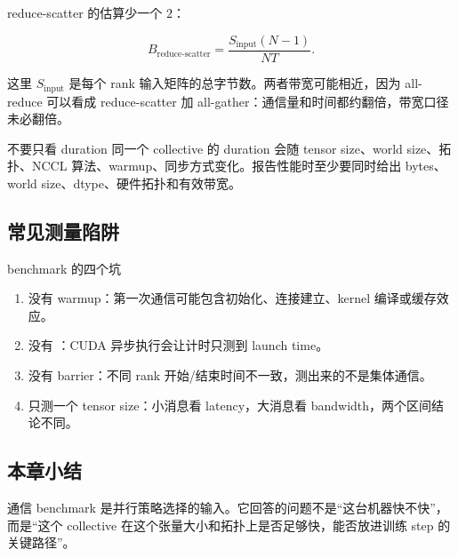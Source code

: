 reduce-scatter 的估算少一个 \(2\)：

\[
B_{\text{reduce-scatter}}
    =
\frac{S_{\text{input}}(N-1)}{N T}.
\]

这里 \(S_{\text{input}}\) 是每个 rank 输入矩阵的总字节数。两者带宽可能相近，因为 all-reduce 可以看成 reduce-scatter 加 all-gather：通信量和时间都约翻倍，带宽口径未必翻倍。

\begin{importantbox}{不要只看 duration}
同一个 collective 的 duration 会随 tensor size、world size、拓扑、NCCL 算法、warmup、同步方式变化。报告性能时至少要同时给出 bytes、world size、dtype、硬件拓扑和有效带宽。
\end{importantbox}

\subsection{常见测量陷阱}

\begin{warningbox}{benchmark 的四个坑}
\begin{enumerate}
    \item 没有 warmup：第一次通信可能包含初始化、连接建立、kernel 编译或缓存效应。
    \item 没有 ：CUDA 异步执行会让计时只测到 launch time。
    \item 没有 barrier：不同 rank 开始/结束时间不一致，测出来的不是集体通信。
    \item 只测一个 tensor size：小消息看 latency，大消息看 bandwidth，两个区间结论不同。
\end{enumerate}
\end{warningbox}

\subsection{本章小结}

通信 benchmark 是并行策略选择的输入。它回答的问题不是“这台机器快不快”，而是“这个 collective 在这个张量大小和拓扑上是否足够快，能否放进训练 step 的关键路径”。


